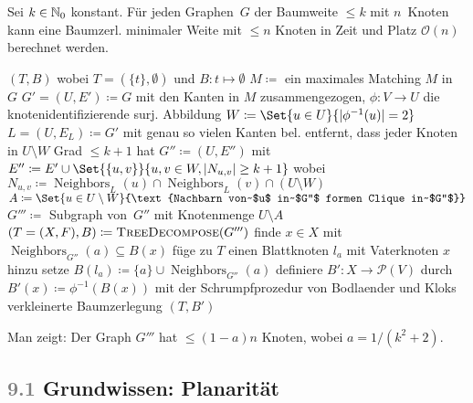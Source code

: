 \documentclass{cheat-sheet}
\newcommand{\size}[1]{\abs{#1}} %
\newcommand{\Powerset}{\mathcal{P}} %
\renewcommand{\O}{\mathcal{O}} %
\DeclareMathOperator{\Neighbors}{Neighbors} %
\newcommand{\IndentState}[1]{\State \quad #1}
\newcommand{\scriptSection}[1]{\textcolor{gray}{#1}\enspace}
\begin{document}
\begin{satz}
  Sei $k \in \mathbb{N}_0$ konstant.
  Für jeden Graphen~$G$ der Baumweite $\leq k$ mit $n$~Knoten kann eine Baumzerl. minimaler Weite mit $\leq n$ Knoten in Zeit und Platz $\O(n)$ berechnet werden.
\end{satz}

\begin{algorithmic}
     \Return $(T, B)$ wobei $T = (\{ t \}, \emptyset)$ und $B : t \mapsto \emptyset$ \EndIf
    \State $M \coloneqq $ ein maximales Matching $M$ in~$G$
    \State $G' = (U, E') \coloneqq G$ mit den Kanten in $M$ zusammengezogen,
    \IndentState $\phi : V \to U$ die knotenidentifizierende surj. Abbildung
    \State $W \coloneqq \Set{u \in U}{\size{\phi^{-1}(u)} = 2}$
    \State $L = (U, E_L) \coloneqq G'$ mit genau so vielen Kanten bel. entfernt,
    \IndentState dass jeder Knoten in $U \setminus W$ Grad $\leq k + 1$ hat
    \State $G'' \coloneqq (U, E'')$ mit $E'' \coloneqq E' \cup \Set{\{ u, v \}}{u, v \in W, \size{N_{u,v}} \geq k+1}$
    \IndentState wobei $N_{u,v} \coloneqq \Neighbors_L(u) \cap \Neighbors_L(v) \cap (U \setminus W)$
    \State $A \coloneqq \Set{u \in U \setminus W}{\text{Nachbarn von~$u$ in~$G''$ formen Clique in~$G''$}}$
    \State $G''' \coloneqq$ Subgraph von~$G''$ mit Knotenmenge $U \setminus A$
    \State $(T = (X, F), B) \coloneqq \Call{TreeDecompose}{G'''}$
      \State finde $x \in X$ mit $\Neighbors_{G''}(a) \subseteq B(x)$
      \State füge zu $T$ einen Blattknoten $l_a$ mit Vaterknoten $x$ hinzu
      \State setze $B(l_a) \coloneqq \{ a \} \cup \Neighbors_{G''}(a)$
    \EndFor
    \State definiere $B' : X \to \Powerset(V)$ durch $B'(x) \coloneqq \phi^{-1}(B(x))$
    \State \Return mit der Schrumpfprozedur von Bodlaender und Kloks
    \IndentState verkleinerte Baumzerlegung $(T, B')$
  \EndFunction
\end{algorithmic}

\begin{bem}
  Man zeigt: Der Graph $G'''$ hat $\leq (1-a) n$ Knoten, wobei $a = 1 / (k^2 + 2)$.
\end{bem}


\subsection{\scriptSection{9.1} Grundwissen: Planarität}
\end{document}
